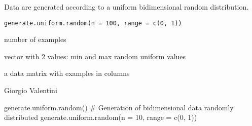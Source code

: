 \documentclass{article}
\begin{document}
\begin{Description}\relax
Data are generated according to a uniform bidimensional random distribution.
\end{Description}
\begin{Usage}
\begin{verbatim}
generate.uniform.random(n = 100, range = c(0, 1))
\end{verbatim}
\end{Usage}
\begin{Arguments}
\begin{ldescription}
\item[\code{n}] number of examples  
\item[\code{range}] vector with 2 values: min and max random uniform values 
\end{ldescription}
\end{Arguments}
\begin{Value}
a data matrix with examples in columns
\end{Value}
\begin{Author}\relax
Giorgio Valentini 
\end{Author}
\begin{Examples}
\begin{ExampleCode}
generate.uniform.random()
# Generation of  bidimensional data randomly distributed
generate.uniform.random(n = 10, range = c(0, 1))
\end{ExampleCode}
\end{Examples}
\end{document}
